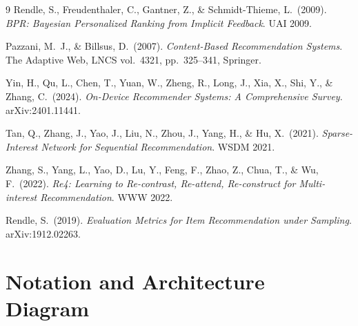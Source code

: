 \documentclass{article}
\begin{document}
\begin{thebibliography}{9}
Rendle, S., Freudenthaler, C., Gantner, Z., \& Schmidt-Thieme, L.\ (2009).
\textit{BPR: Bayesian Personalized Ranking from Implicit Feedback}. UAI 2009.

Pazzani, M.\ J., \& Billsus, D.\ (2007).
\textit{Content-Based Recommendation Systems}. The Adaptive Web, LNCS vol.\ 4321, pp.\ 325--341, Springer.

Yin, H., Qu, L., Chen, T., Yuan, W., Zheng, R., Long, J., Xia, X., Shi, Y., \& Zhang, C.\ (2024).
\textit{On-Device Recommender Systems: A Comprehensive Survey}. arXiv:2401.11441.

Tan, Q., Zhang, J., Yao, J., Liu, N., Zhou, J., Yang, H., \& Hu, X.\ (2021).
\textit{Sparse-Interest Network for Sequential Recommendation}. WSDM 2021.

Zhang, S., Yang, L., Yao, D., Lu, Y., Feng, F., Zhao, Z., Chua, T., \& Wu, F.\ (2022).
\textit{Re4: Learning to Re-contrast, Re-attend, Re-construct for Multi-interest Recommendation}. WWW 2022.

Rendle, S.\ (2019).
\textit{Evaluation Metrics for Item Recommendation under Sampling}. arXiv:1912.02263.

\end{thebibliography}

\appendix

\section{Notation and Architecture Diagram}
\label{app:notation}
\end{document}
